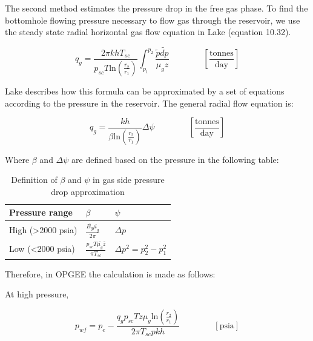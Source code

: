 \documentclass[11pt]{report}
\newcommand{\eqnunit}[1]{\quad\quad \scriptstyle{\left[\text{#1}\right]}}
\newcommand{\eqnunitfrac}[2]{\quad\quad \scriptstyle{\left[\frac{\text{#1}}{\text{#2}}\right]}}
\begin{document}
The second method estimates the pressure drop in the free gas phase. To find the bottomhole flowing pressure necessary to flow gas through the reservoir, we use the steady state radial horizontal gas flow equation in Lake \cite{Holstein2007b} (equation 10.32).

\begin{equation} 
q_{g} = \frac{2 \pi k h T_{sc}}{p_{sc} T \text{ln}\left(\frac{r_2}{r_1} \right)} \int_{p_1}^{p_2} \frac{\tilde{p} \tilde{dp}}{\mu_g z} \quad\quad\eqnunitfrac{tonnes}{day}
\end{equation}

Lake describes how this formula can be approximated by a set of equations according to the pressure in the reservoir. The general radial flow equation is:

\begin{equation} 
q_{g} = \frac{k h}{\beta \text{ln}\left(\frac{r_2}{r_1} \right)} \Delta \psi \quad\quad\eqnunitfrac{tonnes}{day}
\end{equation}

Where $\beta$ and $\Delta \psi$ are defined based on the pressure in the following table:

\begin{table}[ht]
\begin{scriptsize}
\caption{Definition of $\beta$ and $\psi$ in gas side pressure drop approximation}
\begin{tabular*}{0.8\columnwidth}{p{}p{}p{}}
\toprule
Pressure range & $\beta$ & $\psi$ \\
\midrule
High (>2000 psia) & $\frac{\overline{B_g}\overline{\mu_g}}{2\pi}$ & $\Delta p$ \\
Low (<2000 psia) & $\frac{p_{sc} T \overline{\mu_g} \overline{z}}{\pi T_{sc}}$ & $\Delta p^2 = p_2^2 - p_1^2$ \\
\bottomrule
\end{tabular*}
\end{scriptsize}
\end{table}

Therefore, in OPGEE the calculation is made as follows:

At high pressure,

\begin{equation} 
p_{wf} = p_e - \frac{q_g p_{sc} T z \mu_g \text{ln}\left(\frac{r_2}{r_1} \right)}{2 \pi T_{sc} p k h} \quad\quad\eqnunit{psia}
\end{equation}
\end{document}
